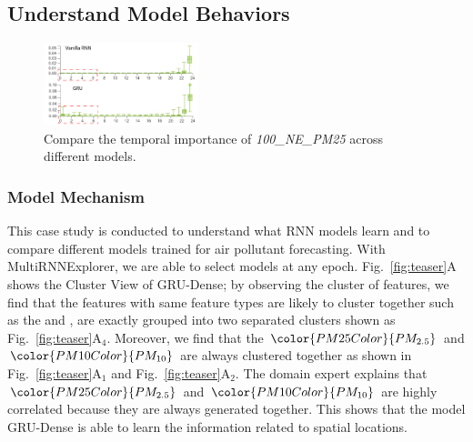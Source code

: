 \subsection{Understand Model Behaviors}
\begin{figure}[t]
	\centering
	\includegraphics[width=0.40\textwidth]{figure/MultiRNNExplorer/Evaluation/FI_comparison.pdf}
	\vspace{-3mm}
	\caption{Compare the temporal importance of \textit{100\_NE\_PM25}  across different models. 
	}
	\label{fig:gru_vs_rnn}
	\vspace{-4mm}
\end{figure}

\subsubsection{Model Mechanism}
This case study is conducted to understand what RNN models learn and to compare different models trained for air pollutant forecasting. 
With MultiRNNExplorer, we are able to select models at any epoch. Fig.~\ref{fig:teaser}A shows the Cluster View of GRU-Dense; by observing the cluster of features, we find that the features with same feature types are likely to cluster together such as the \textit{\color{RHColor}{Relative Humidity}} and \textit{\color{DPColor}{Dew-point}}, are exactly grouped into two separated clusters shown as Fig.~\ref{fig:teaser}A$_4$.
Moreover, we find that the $\color{PM25Color}{PM_{2.5}}$ and $\color{PM10Color}{PM_{10}}$ are always clustered together as shown in Fig.~\ref{fig:teaser}A$_1$ and Fig.~\ref{fig:teaser}A$_2$.
The domain expert explains that $\color{PM25Color}{PM_{2.5}}$ and $\color{PM10Color}{PM_{10}}$ are highly correlated because they are always generated together.
This  shows that the model GRU-Dense is able to learn the information related to spatial locations.  


